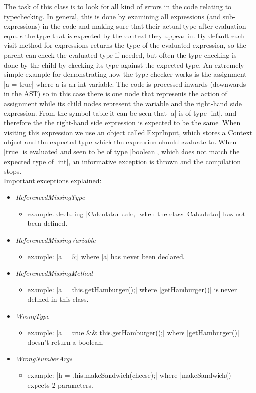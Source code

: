 \documentclass[paper=a4, fontsize=11pt]{scrartcl} %
\numberwithin{equation}{section} %
\numberwithin{figure}{section} %
\numberwithin{table}{section} %
\begin{document}
The task of this class is to look for all kind of errors in the code relating to typechecking.
In general, this is done by examining all expressions (and sub-expressions) in the code and making sure that their actual type after evaluation equals the type that is expected by the context they appear in.
By default each visit method for expressions returns the type of the evaluated expression, so the parent can check the evaluated type if needed, but often the type-checking is done by the child by checking its type against the expected type.
An extremely simple example for demonstrating how the type-checker works is the assignment |a = true| where a is an int-variable.
The code is processed inwards (downwards in the AST) so in this case there is one node that represents the action of assignment while its child nodes represent the variable and the right-hand side expression.
From the symbol table it can be seen that |a| is of type |int|, and therefore the the right-hand side expression is expected to be the same.
When visiting this expression we use an object called ExprInput, which stores a Context object and the expected type which the expression should evaluate to.
When |true| is evaluated and seen to be of type |boolean|, which does not match the expected type of |int|, an informative exception is thrown and the compilation stops.\\

Important exceptions explained:
\begin{itemize}
  \item{\emph{ReferencedMissingType}}
  \begin{itemize}
    \item{example: declaring |Calculator calc;| when the class |Calculator| has not been defined.}
  \end{itemize}
  \item{\emph{ReferencedMissingVariable}}
  \begin{itemize}
    \item{example: |a = 5;| where |a| has never been declared.}
  \end{itemize}
  \item{\emph{ReferencedMissingMethod}}
  \begin{itemize}
    \item{example: |a = this.getHamburger();| where |getHamburger()| is never defined in this class.}
  \end{itemize}
  \item{\emph{WrongType}}
  \begin{itemize}
    \item{example: |a = true && this.getHamburger();| where |getHamburger()| doesn’t return a boolean.}
  \end{itemize}
  \item{\emph{WrongNumberArgs}}
  \begin{itemize}
    \item{example: |h = this.makeSandwich(cheese);| where |makeSandwich()| expects 2 parameters. }
  \end{itemize}
\end{itemize}
\end{document}
